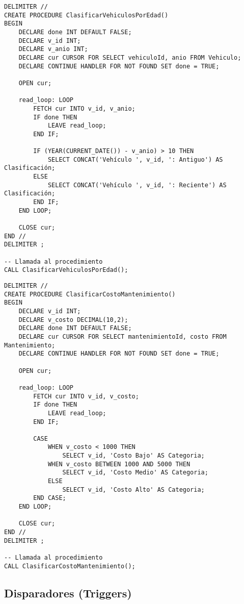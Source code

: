 \documentclass{article}
\begin{document}
\begin{lstlisting}[style=sqlstyle]
    DELIMITER //
CREATE PROCEDURE ClasificarVehiculosPorEdad()
BEGIN
    DECLARE done INT DEFAULT FALSE;
    DECLARE v_id INT;
    DECLARE v_anio INT;
    DECLARE cur CURSOR FOR SELECT vehiculoId, anio FROM Vehiculo;
    DECLARE CONTINUE HANDLER FOR NOT FOUND SET done = TRUE;
    
    OPEN cur;
    
    read_loop: LOOP
        FETCH cur INTO v_id, v_anio;
        IF done THEN
            LEAVE read_loop;
        END IF;
        
        IF (YEAR(CURRENT_DATE()) - v_anio) > 10 THEN
            SELECT CONCAT('Vehículo ', v_id, ': Antiguo') AS Clasificación;
        ELSE
            SELECT CONCAT('Vehículo ', v_id, ': Reciente') AS Clasificación;
        END IF;
    END LOOP;
    
    CLOSE cur;
END //
DELIMITER ;

-- Llamada al procedimiento
CALL ClasificarVehiculosPorEdad();
\end{lstlisting}

\begin{lstlisting}[style=sqlstyle]
    DELIMITER //
CREATE PROCEDURE ClasificarCostoMantenimiento()
BEGIN
    DECLARE v_id INT;
    DECLARE v_costo DECIMAL(10,2);
    DECLARE done INT DEFAULT FALSE;
    DECLARE cur CURSOR FOR SELECT mantenimientoId, costo FROM Mantenimiento;
    DECLARE CONTINUE HANDLER FOR NOT FOUND SET done = TRUE;
    
    OPEN cur;
    
    read_loop: LOOP
        FETCH cur INTO v_id, v_costo;
        IF done THEN
            LEAVE read_loop;
        END IF;
        
        CASE
            WHEN v_costo < 1000 THEN
                SELECT v_id, 'Costo Bajo' AS Categoria;
            WHEN v_costo BETWEEN 1000 AND 5000 THEN
                SELECT v_id, 'Costo Medio' AS Categoria;
            ELSE
                SELECT v_id, 'Costo Alto' AS Categoria;
        END CASE;
    END LOOP;
    
    CLOSE cur;
END //
DELIMITER ;

-- Llamada al procedimiento
CALL ClasificarCostoMantenimiento();
\end{lstlisting}

\subsection{Disparadores (Triggers)}
\end{document}
